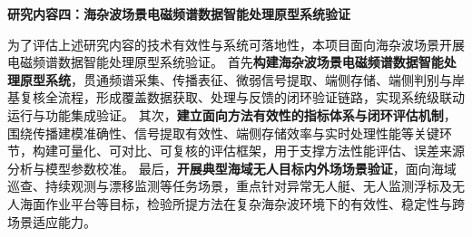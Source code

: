 
\textbf{研究内容四：海杂波场景电磁频谱数据智能处理原型系统验证}

为了评估上述研究内容的技术有效性与系统可落地性，本项目面向海杂波场景开展电磁频谱数据智能处理原型系统验证。
首先\textbf{构建海杂波场景电磁频谱数据智能处理原型系统}，贯通频谱采集、传播表征、微弱信号提取、端侧存储、端侧判别与岸基复核全流程，形成覆盖数据获取、处理与反馈的闭环验证链路，实现系统级联动运行与功能集成验证。
其次，\textbf{建立面向方法有效性的指标体系与闭环评估机制}，围绕传播建模准确性、信号提取有效性、端侧存储效率与实时处理性能等关键环节，构建可量化、可对比、可复核的评估框架，用于支撑方法性能评估、误差来源分析与模型参数校准。
最后，\textbf{开展典型海域无人目标内外场场景验证}，面向海域巡查、持续观测与漂移监测等任务场景，重点针对异常无人艇、无人监测浮标及无人海面作业平台等目标，检验所提方法在复杂海杂波环境下的有效性、稳定性与跨场景适应能力。